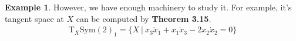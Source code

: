 \documentclass[12pt]{article}
\newcommand*{\T}{\mathrm{T}}
\theoremstyle{definition}
\newtheorem{example}{Example}[section]
\begin{document}
\begin{example}
    However, we have enough machinery to study it. For example, it's tangent space at $X$ can be computed by \textbf{Theorem 3.15}. 
    \begin{equation}
        \T_X \text{Sym}(2)_1 = \{\dot{X} \ | \ x_3 \dot{x}_1 + x_1 \dot{x}_3 - 2x_2 \dot{x}_2 = 0 \}
    \end{equation}
\end{example}
\end{document}

